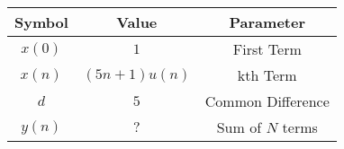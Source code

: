 
\begin{tabular}{|c|c|c|}
\hline
\textbf{Symbol} & \textbf{Value} & \textbf{Parameter} \\
\hline
\(x(0)\) & \(1 \) & First Term \\
\hline
\(x(n)\) & \((5n+1)u(n)\) & kth Term \\
\hline
\(d\) & \(5 \) & Common Difference \\
\hline
\(y(n)\) & \(?\) & Sum of \(N\) terms \\
\hline
\end{tabular}
